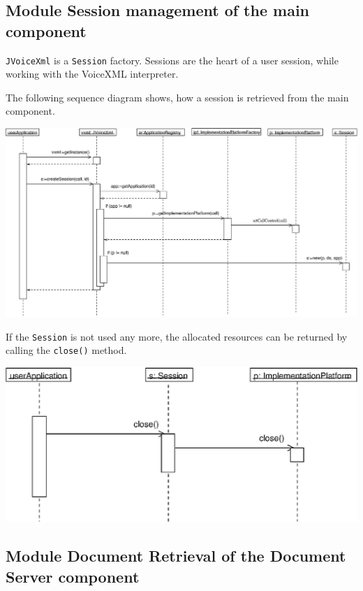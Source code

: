 \documentclass[11pt,a4paper]{article}
\begin{document}
\subsection{Module Session management of the main component}

\texttt{JVoiceXml} is a \texttt{Session} factory\cite{gamma:design_patterns}. 
Sessions are the heart of a user session, while working with the VoiceXML 
interpreter.

The following sequence diagram shows, how a session is retrieved
from the main component.

\begin{center}
\includegraphics[scale=0.4]{seq-jvoicexml-sessionfactory.eps}
\end{center}

If the \texttt{Session} is not used any more, the allocated resources
can be returned by calling the \texttt{close()} method.

\begin{center}
\includegraphics[scale=0.6]{seq-jvoicexml-sessionclose.eps}
\end{center}

\subsection{Module Document Retrieval of the Document Server component}
\label{sec:module-docum-serv}
\end{document}
